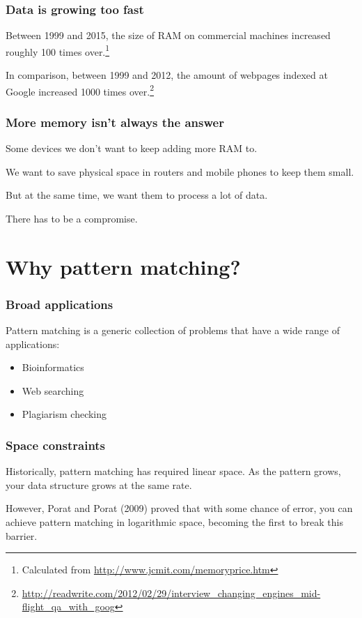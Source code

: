 \documentclass{beamer}
\begin{document}
\begin{frame}
\frametitle{Data is growing too fast}
Between 1999 and 2015, the size of RAM on commercial machines increased roughly 100 times over.\footnote{Calculated from \url{http://www.jcmit.com/memoryprice.htm}}

In comparison, between 1999 and 2012, the amount of webpages indexed at Google increased 1000 times over.\footnote{\url{http://readwrite.com/2012/02/29/interview_changing_engines_mid-flight_qa_with_goog}}
\end{frame}


\begin{frame}
\frametitle{More memory isn't always the answer}
Some devices we don't want to keep adding more RAM to.

We want to save physical space in routers and mobile phones to keep them small.

But at the same time, we want them to process a lot of data.

There has to be a compromise.
\end{frame}

\section{Why pattern matching?}

\begin{frame}
\frametitle{Broad applications}
Pattern matching is a generic collection of problems that have a wide range of applications:

\begin{itemize}
    \item Bioinformatics
    \item Web searching
    \item Plagiarism checking
\end{itemize}
\end{frame}


\begin{frame}
\frametitle{Space constraints}
Historically, pattern matching has required linear space. As the pattern grows, your data structure grows at the same rate.

However, Porat and Porat (2009) proved that with some chance of error, you can achieve pattern matching in logarithmic space, becoming the first to break this barrier.
\end{frame}
\end{document}
